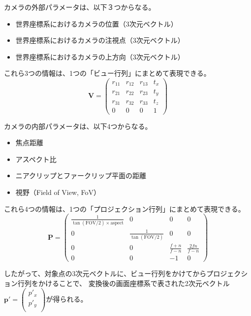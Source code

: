 カメラの外部パラメータは、以下３つからなる。
\begin{itemize}
  \item 世界座標系におけるカメラの位置（3次元ベクトル）
  \item 世界座標系におけるカメラの注視点（3次元ベクトル）
  \item 世界座標系におけるカメラの上方向（3次元ベクトル）
\end{itemize}
これら3つの情報は、1つの「ビュー行列」にまとめて表現できる。
$$
\mathbf{V} = 
\begin{pmatrix}
r_{11} & r_{12} & r_{13} & t_x \\
r_{21} & r_{22} & r_{23} & t_y \\
r_{31} & r_{32} & r_{33} & t_z \\
0 & 0 & 0 & 1
\end{pmatrix}
$$


カメラの内部パラメータは、以下4つからなる。
\begin{itemize}
  \item 焦点距離
  \item アスペクト比
  \item ニアクリップとファークリップ平面の距離
  \item 視野（Field of View, FoV）
\end{itemize}
これら4つの情報は、1つの「プロジェクション行列」にまとめて表現できる。
$$
\mathbf{P} = 
\begin{pmatrix}
\frac{1}{\tan(\text{FOV}/2) \times \text{aspect}} & 0 & 0 & 0 \\
0 & \frac{1}{\tan(\text{FOV}/2)} & 0 & 0 \\
0 & 0 & \frac{f+n}{f-n} & \frac{2fn}{f-n} \\
0 & 0 & -1 & 0
\end{pmatrix}
$$

したがって、対象点の3次元ベクトルに、ビュー行列をかけてからプロジェクション行列をかけることで、
変換後の画面座標系で表された2次元ベクトル$\bm{p'} =
\begin{pmatrix}
  {p'_x} \\
  {p'_y} \\    
\end{pmatrix}
$が得られる。

